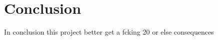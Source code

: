 \section{Conclusion}
In conclusion \newline
this project better get a fcking 20 or else consequences
